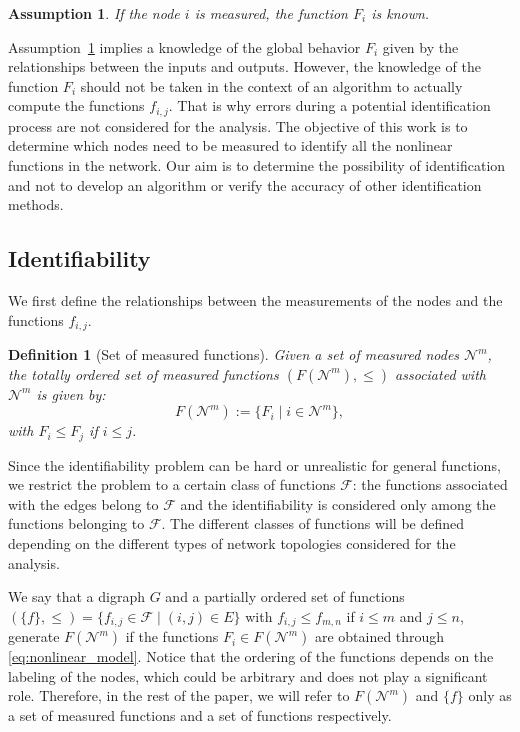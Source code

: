 \documentclass[letterpaper,10pt,journal]{IEEEtran}
\newcommand{\F}{\mathcal{F}}
\newtheorem{definition}{Definition}
\newtheorem{assumption}{Assumption}
\begin{document}
\begin{assumption}\label{ass:knowledge_Fi}
If the node $i$ is measured, the function $F_i$ is known.
\end{assumption}

 
Assumption~\ref{ass:knowledge_Fi} implies a knowledge of the global behavior $F_i$ given by the relationships between the inputs and outputs. However, the knowledge of the function $F_i$ should not be taken in the context of an algorithm to actually compute the functions $f_{i,j}$. That is why errors during a potential identification process are not considered for the analysis. The objective of this work is
to determine which nodes need to be  measured
to identify all the nonlinear functions in the network. Our
aim is to determine the possibility of identification and not
to develop an algorithm or verify the accuracy of other
identification methods.




 


\subsection{Identifiability}



We first define the relationships between the measurements of the nodes and the functions $f_{i,j}$.


\begin{definition}[Set of measured functions]\label{def:set_measured_functions}
    Given a set of measured nodes $\mathcal{N}^m$, the totally ordered set of measured functions $(F(\mathcal{N}^m),\le)$ associated with $\mathcal{N}^m$ is given by:
    $$
    F(\mathcal{N}^m):=\{F_i\;|\;i\in \mathcal{N}^m\},
    $$
    with $F_i\le F_j$ if $i\le j$.
\end{definition}
Since the identifiability problem can be hard or unrealistic for general functions, we restrict the problem to  a certain class of functions $\F$: the functions associated with the edges belong to $\F$ and the identifiability is considered only among the functions belonging to $\F$. The different classes of functions will be defined depending on the different types of network topologies considered for the analysis.  

We say that a digraph $G$ and a partially ordered set of functions $(\{ f \},\le)=\{f_{i,j}\in \F\;|\;(i,j)\in E\}$ with $f_{i,j}\le f_{m,n}$ if $i\le m$ and $j\le n$, generate $F(\mathcal{N}^m)$ if the functions $F_i\in F(\mathcal{N}^m)$ are obtained \linebreak through \eqref{eq:nonlinear_model}. Notice that the ordering of the functions depends on the labeling of the nodes, which could be arbitrary and does not play a significant role. Therefore, in the rest of the paper, we will refer to $F(\mathcal{N}^m)$ and $\{ f \}$ only as a set of measured functions and a set of functions respectively. 
\end{document}
